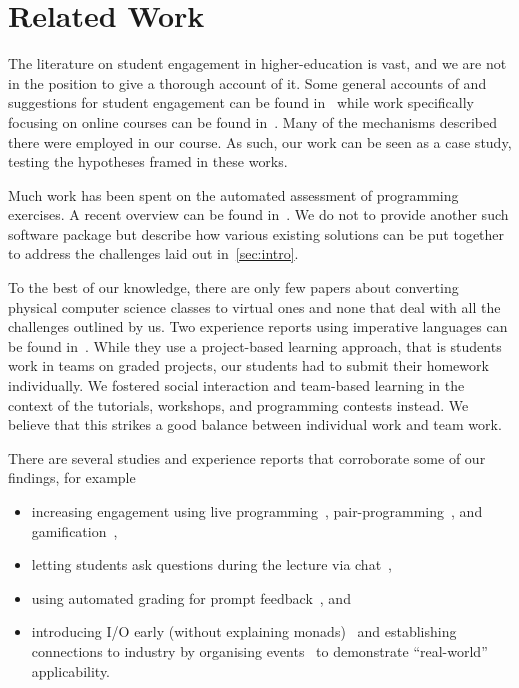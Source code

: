 \section{Related Work}\label{sec:related_work}

The literature on student engagement in higher-education is vast,
and we are not in the position to give a thorough account of it.
Some general accounts of and suggestions for
student engagement can be found in~\cite{student_engagement,engagementproposals}
while work specifically focusing on online courses can be found in~\cite{onlineengagement3,onlineengagement2,onlineengagement4,onlineengagement5,onlineengagement1}.
Many of the mechanisms described there were employed in our course.
As such, our work can be seen as a case study, testing the hypotheses framed in these works.

Much work has been spent on the
automated assessment of programming exercises.
A recent overview can be found in~\cite{automatedassessment}.
We do not to provide another such software package but
describe how various existing solutions
can be put together to
address the challenges laid out in~\cref{sec:intro}.

To the best of our knowledge,
there are only few papers about converting physical computer science classes to virtual ones
and none that deal with all the challenges outlined by us.
Two experience reports using imperative languages can be found in~\cite{largeprogrammingclass,onlinecourse1}.
While they use a project-based learning approach,
that is students work in teams on graded projects,
our students had to submit their homework individually.
We fostered social interaction and team-based learning
in the context of the tutorials, workshops,
and programming contests instead.
We believe that this strikes a good balance
between individual work and team work.

There are several studies and experience reports that corroborate some of our findings, for example
\begin{itemize}
  \item increasing engagement using live programming~\cite{fp_first_year_risks_benefits,livecoding1,livecoding2}, pair-programming~\cite{engagingprogramming,teaching_fp_first_year}, and gamification~\cite{soccerfun,teaching_fp_glossy_games,teaching_fp_macedonian},
  \item letting students ask questions during the lecture via chat~\cite{increase_interest_fp},
  \item using automated grading for prompt feedback~\cite{teaching_fp_glossy_games,teaching_art_fp_automated,teaching_fp_macedonian}, and
  \item introducing I/O early (without explaining monads)~\cite{fp_first_year_risks_benefits,haskell_school_hudak,teaching_fp_chalmers} and establishing connections to industry by organising events~\cite{teaching_fp_chalmers} to demonstrate ``real-world'' applicability.
\end{itemize}

